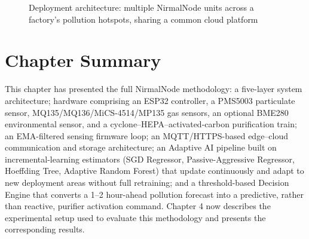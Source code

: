 \begin{figure}[htbp]
\centering
{}
\caption{Deployment architecture: multiple NirmalNode units across a factory's pollution hotspots, sharing a common cloud platform}
\label{fig:deployment-arch}
\end{figure}

\FloatBarrier

\section{Chapter Summary}
\label{sec:meth-summary}

This chapter has presented the full NirmalNode methodology: a five-layer system architecture; hardware comprising an ESP32 controller, a PMS5003 particulate sensor, MQ135/MQ136/MiCS-4514/MP135 gas sensors, an optional BME280 environmental sensor, and a cyclone--HEPA--activated-carbon purification train; an EMA-filtered sensing firmware loop; an MQTT/HTTPS-based edge--cloud communication and storage architecture; an Adaptive AI pipeline built on incremental-learning estimators (SGD Regressor, Passive-Aggressive Regressor, Hoeffding Tree, Adaptive Random Forest) that update continuously and adapt to new deployment areas without full retraining; and a threshold-based Decision Engine that converts a 1--2 hour-ahead pollution forecast into a predictive, rather than reactive, purifier activation command. Chapter 4 now describes the experimental setup used to evaluate this methodology and presents the corresponding results.
